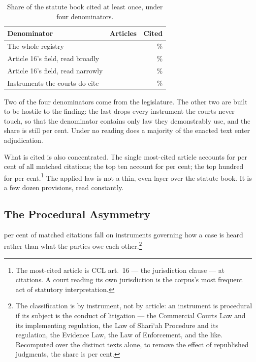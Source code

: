 \documentclass[12pt]{article}
\begin{document}
\begin{table}[t]
\centering
\singlespacing
\caption{Share of the statute book cited at least once, under four
denominators.}
\label{tab:denominators}
\begin{tabular}{lrr}
\toprule
Denominator & Articles & Cited \\
\midrule
The whole registry                & \nRegistryArticles{}    & \nArticlesCitedShare{}\% \\
Article 16's field, read broadly  & \nScopeBroadArticles{}  & \nScopeBroadShare{}\% \\
Article 16's field, read narrowly & \nScopeNarrowArticles{} & \nScopeNarrowShare{}\% \\
Instruments the courts do cite    & \nAppliedOnlyArticles{} & \nAppliedOnlyShare{}\% \\
\bottomrule
\end{tabular}
\end{table}

Two of the four denominators come from the legislature. The other two are
built to be hostile to the finding: the last drops every instrument the courts
never touch, so that the denominator contains only law they demonstrably use,
and the share is still \nAppliedOnlyShare{} per cent. Under no reading does a
majority of the enacted text enter adjudication.

What is cited is also concentrated. The single most-cited article accounts for
\nArtTopOneShare{} per cent of all matched citations; the top ten account for
\nArtTopTenShare{} per cent; the top hundred for
\nArtTopHundredShare{} per cent.\footnote{The most-cited article is CCL
art.~16 --- the jurisdiction clause --- at \nTopArticleCitations{} citations.
A court reading its own jurisdiction is the corpus's most frequent act of
statutory interpretation.} The applied law is not a thin, even layer over the
statute book. It is a few dozen provisions, read constantly.

\subsection{The Procedural Asymmetry}

\nProceduralShare{} per cent of matched citations fall on instruments
governing how a case is heard rather than what the parties owe each
other.\footnote{The classification is by instrument, not by article: an
instrument is procedural if its subject is the conduct of litigation --- the
Commercial Courts Law and its implementing regulation, the Law of Shar\=i`ah
Procedure and its regulation, the Evidence Law, the Law of Enforcement, and
the like. Recomputed over the \nDistinctTexts{} distinct texts alone, to
remove the effect of republished judgments, the share is
\nDedupProcedural{} per cent.}
\end{document}
